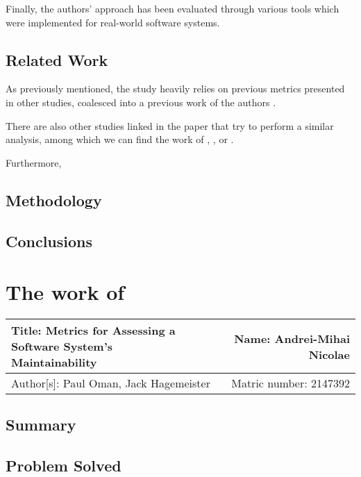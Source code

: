 \documentclass[a4paper,portrait,12pt]{article}
\begin{document}
Finally, the authors' approach has been evaluated through various tools which were
implemented for real-world software systems.

\subsection{Related Work}

As previously mentioned, the study heavily relies on previous metrics presented 
in other studies, coalesced into a previous work of the authors 
\citep{oman1992definition}. 

There are also other studies linked in the paper that try to perform a similar analysis,
among which we can find the work of \citet{basili1983empirical}, 
\citet{peercy1981software}, \citet{selby1989software} or \citet{kafura1987use}.

Furthermore, 


\subsection{Methodology}

\subsection{Conclusions}

\section{The work of \cite{pfleeger1990framework}}

 \begin{center}
   \begin{tabular}{ | l | r | }
    \hline
    \parbox[t]{5cm}{Title: Metrics for Assessing a Software System's
                    \\  Maintainability} 
     & Name: Andrei-Mihai Nicolae \\ 
     \hline
     Author[s]: Paul Oman, Jack Hagemeister & Matric number: 2147392 \\
    \hline
   \end{tabular}
 \end{center}

\subsection{Summary}



\subsection{Problem Solved}
\end{document}
